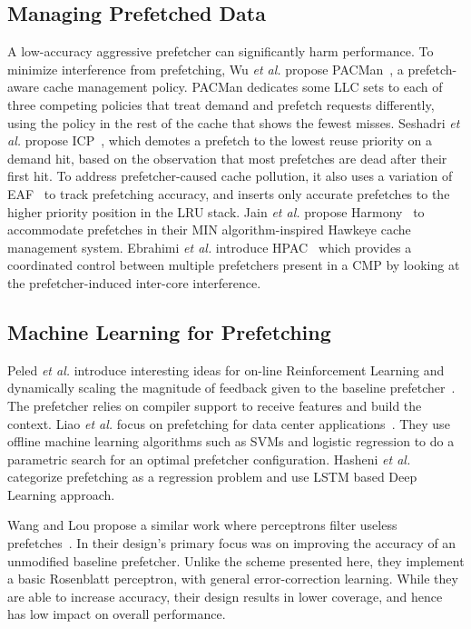 \subsection{Managing Prefetched Data}

A low-accuracy aggressive prefetcher can significantly harm
performance.  To minimize interference from prefetching, Wu \textit{et
  al.} propose PACMan~\cite{pacman}, a prefetch-aware cache management
policy. PACMan dedicates some LLC sets to each of three competing
policies that treat demand and prefetch requests differently, using
the policy in the rest of the cache that shows the fewest
misses. Seshadri \textit{et al.} propose ICP~\cite{icp}, which demotes
a prefetch to the lowest reuse priority on a demand hit, based on the
observation that most prefetches are dead after their first hit. To
address prefetcher-caused cache pollution, it also uses a variation of
EAF~\cite{eaf} to track prefetching accuracy, and inserts only
accurate prefetches to the higher priority position in the LRU
stack. Jain \textit{et al.} propose Harmony~\cite{Harmony} to
accommodate prefetches in their MIN algorithm-inspired Hawkeye cache
management system. Ebrahimi \textit{et al.} introduce
HPAC~\cite{HPAC} which provides a coordinated control between 
multiple prefetchers present in a CMP by looking at the 
prefetcher-induced inter-core interference.

\subsection{Machine Learning for Prefetching}

Peled \textit{et al.} introduce interesting ideas for on-line
Reinforcement Learning and dynamically scaling the magnitude of
feedback given to the baseline prefetcher~\cite{Semantics}. The
prefetcher relies on compiler support to receive features and build
the context.  Liao \textit{et al.}  focus on prefetching for data
center applications~\cite{Datacenter}.  They use offline machine
learning algorithms such as SVMs and logistic regression to do a
parametric search for an optimal prefetcher configuration.  Hasheni
\textit{et al.}~\cite{LSTM} categorize prefetching as a regression
problem and use LSTM based Deep Learning approach.

Wang and Lou propose a similar work where perceptrons filter useless
prefetches~\cite{ArxivPerc}.  In their design's primary focus was on
improving the accuracy of an unmodified baseline prefetcher.  Unlike
the scheme presented here, they implement a basic Rosenblatt
perceptron, with general error-correction learning.  While they are
able to increase accuracy, their design results in lower coverage, and
hence has low impact on overall performance.


